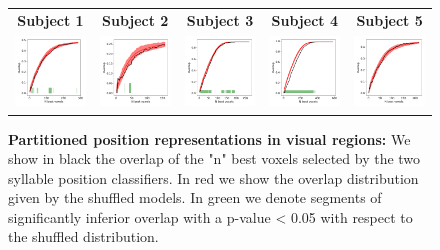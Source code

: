 \begin{figure}[ht]
\scriptsize
\vspace{2ex}
\hspace{-4ex}
\begin{tabular}{ccccc}
\textbf{\Large Subject 1} & \textbf{\Large Subject 2} & \textbf{\Large Subject 3} & \textbf{\Large Subject 4} & \textbf{\Large Subject 5}\\
{\includegraphics[width=.19\linewidth]{figures/part_II/locality/visual/locality_test_01.png}}
\hspace{0ex}
&{\includegraphics[width=.19\linewidth]{figures/part_II/locality/visual/locality_test_03.png}}
\hspace{0ex}
&{\includegraphics[width=.19\linewidth]{figures/part_II/locality/visual/locality_test_04.png}}
\hspace{0ex}
&{\includegraphics[width=.19\linewidth]{figures/part_II/locality/visual/locality_test_05.png}}
\hspace{0ex}
&{\includegraphics[width=.19\linewidth]{figures/part_II/locality/visual/locality_test_06.png}}
\hspace{-1ex} \\
\end{tabular}
\vspace{3ex}
\caption{\textbf{Partitioned position representations in visual regions:}
We show in black the overlap of the "n" best voxels selected by the two syllable position classifiers. In red we show the overlap distribution given by the shuffled models. In green we denote segments of significantly inferior overlap with a p-value < 0.05 with respect to the shuffled distribution.}
\label{fig:visual_locality}
\end{figure}


